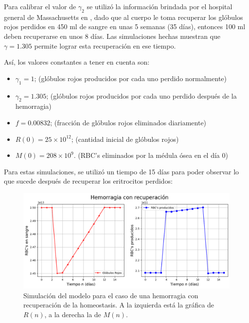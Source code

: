 Para calibrar el valor de $\gamma_2$ se utilizó la información brindada por el hospital general de Massachusetts en \cite{Massachusetts}, dado que al cuerpo le toma recuperar los glóbulos rojos perdidos en 450 ml de sangre en unas 5 semanas (35 días), entonces 100 ml deben recuperarse en unos 8 días. Las simulaciones hechas muestran que $\gamma=1.305$ permite lograr esta recuperación en ese tiempo.

Así, los valores constantes a tener en cuenta son:
\begin{itemize}
    \item $\gamma_1=1$; (glóbulos rojos producidos por cada uno perdido normalmente)
    \item $\gamma_2=1.305$; (glóbulos rojos producidos por cada uno perdido después de la hemorragia)
    \item $f=0.00832$; (fracción de glóbulos rojos eliminados diariamente)
    \item $R(0) = 25\times 10^{12}$; (cantidad inicial de glóbulos rojos)
    \item $M(0) = 208 \times 10^{9}$. (RBC's eliminados por la médula ósea en el día 0)
\end{itemize}

Para estas simulaciones, se utilizó un tiempo de 15 días para poder observar lo que sucede después de recuperar los eritrocitos perdidos:

\begin{figure}[H]
    \centering
    \captionsetup{justification=centering}
    \includegraphics[scale=0.534]{figures/HemoLeveG13.png}
    \caption{Simulación del modelo para el caso de una hemorragia con recuperación de la homeostasis. A la izquierda está la gráfica de $R(n)$, a la derecha la de $M(n)$.}
    \label{sec:variaciones:fig:HemoLeveG13}
\end{figure}

